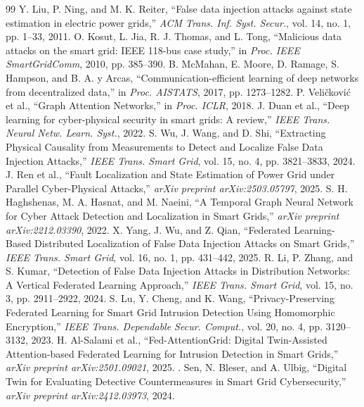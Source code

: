 \documentclass[conference]{IEEEtran}
\begin{document}
\begin{thebibliography}{99}
 Y. Liu, P. Ning, and M. K. Reiter, ``False data injection attacks against state estimation in electric power grids,'' \textit{ACM Trans. Inf. Syst. Secur.}, vol. 14, no. 1, pp. 1--33, 2011.
 O. Kosut, L. Jia, R. J. Thomas, and L. Tong, ``Malicious data attacks on the smart grid: IEEE 118-bus case study,'' in \textit{Proc. IEEE SmartGridComm}, 2010, pp. 385--390.
 B. McMahan, E. Moore, D. Ramage, S. Hampson, and B. A. y Arcas, ``Communication-efficient learning of deep networks from decentralized data,'' in \textit{Proc. AISTATS}, 2017, pp. 1273--1282.
 P. Veli\v{c}kovi\'{c} et al., ``Graph Attention Networks,'' in \textit{Proc. ICLR}, 2018.
 J. Duan et al., ``Deep learning for cyber-physical security in smart grids: A review,'' \textit{IEEE Trans. Neural Netw. Learn. Syst.}, 2022.
 S. Wu, J. Wang, and D. Shi, ``Extracting Physical Causality from Measurements to Detect and Localize False Data Injection Attacks,'' \textit{IEEE Trans. Smart Grid}, vol. 15, no. 4, pp. 3821--3833, 2024.
 J. Ren et al., ``Fault Localization and State Estimation of Power Grid under Parallel Cyber-Physical Attacks,'' \textit{arXiv preprint arXiv:2503.05797}, 2025.
 S. H. Haghshenas, M. A. Hasnat, and M. Naeini, ``A Temporal Graph Neural Network for Cyber Attack Detection and Localization in Smart Grids,'' \textit{arXiv preprint arXiv:2212.03390}, 2022.
 X. Yang, J. Wu, and Z. Qian, ``Federated Learning-Based Distributed Localization of False Data Injection Attacks on Smart Grids,'' \textit{IEEE Trans. Smart Grid}, vol. 16, no. 1, pp. 431--442, 2025.
 R. Li, P. Zhang, and S. Kumar, ``Detection of False Data Injection Attacks in Distribution Networks: A Vertical Federated Learning Approach,'' \textit{IEEE Trans. Smart Grid}, vol. 15, no. 3, pp. 2911--2922, 2024.
 S. Lu, Y. Cheng, and K. Wang, ``Privacy-Preserving Federated Learning for Smart Grid Intrusion Detection Using Homomorphic Encryption,'' \textit{IEEE Trans. Dependable Secur. Comput.}, vol. 20, no. 4, pp. 3120--3132, 2023.
 H. Al-Salami et al., ``Fed-AttentionGrid: Digital Twin-Assisted Attention-based Federated Learning for Intrusion Detection in Smart Grids,'' \textit{arXiv preprint arXiv:2501.09021}, 2025.
 . Sen, N. Bleser, and A. Ulbig, ``Digital Twin for Evaluating Detective Countermeasures in Smart Grid Cybersecurity,'' \textit{arXiv preprint arXiv:2412.03973}, 2024.

\end{thebibliography}
\end{document}
